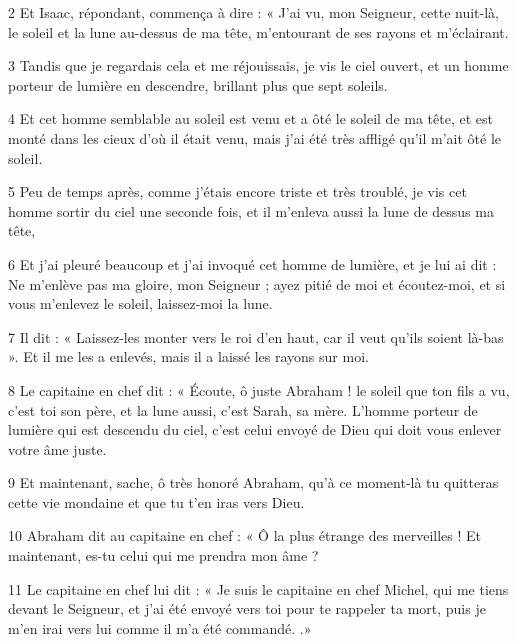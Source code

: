 \par 2 Et Isaac, répondant, commença à dire : « J'ai vu, mon Seigneur, cette nuit-là, le soleil et la lune au-dessus de ma tête, m'entourant de ses rayons et m'éclairant.

\par 3 Tandis que je regardais cela et me réjouissais, je vis le ciel ouvert, et un homme porteur de lumière en descendre, brillant plus que sept soleils.

\par 4 Et cet homme semblable au soleil est venu et a ôté le soleil de ma tête, et est monté dans les cieux d'où il était venu, mais j'ai été très affligé qu'il m'ait ôté le soleil.

\par 5 Peu de temps après, comme j'étais encore triste et très troublé, je vis cet homme sortir du ciel une seconde fois, et il m'enleva aussi la lune de dessus ma tête,

\par 6 Et j'ai pleuré beaucoup et j'ai invoqué cet homme de lumière, et je lui ai dit : Ne m'enlève pas ma gloire, mon Seigneur ; ayez pitié de moi et écoutez-moi, et si vous m'enlevez le soleil, laissez-moi la lune.

\par 7 Il dit : « Laissez-les monter vers le roi d'en haut, car il veut qu'ils soient là-bas ». Et il me les a enlevés, mais il a laissé les rayons sur moi.

\par 8 Le capitaine en chef dit : « Écoute, ô juste Abraham ! le soleil que ton fils a vu, c'est toi son père, et la lune aussi, c'est Sarah, sa mère. L’homme porteur de lumière qui est descendu du ciel, c’est celui envoyé de Dieu qui doit vous enlever votre âme juste.

\par 9 Et maintenant, sache, ô très honoré Abraham, qu'à ce moment-là tu quitteras cette vie mondaine et que tu t'en iras vers Dieu.

\par 10 Abraham dit au capitaine en chef : « Ô la plus étrange des merveilles ! Et maintenant, es-tu celui qui me prendra mon âme ?

\par 11 Le capitaine en chef lui dit : « Je suis le capitaine en chef Michel, qui me tiens devant le Seigneur, et j'ai été envoyé vers toi pour te rappeler ta mort, puis je m'en irai vers lui comme il m'a été commandé. .»

